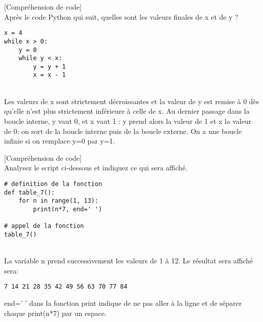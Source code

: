 \documentclass[a4paper,12pt]{article}
\begin{document}
\finexo
\exo{}[Compréhension de code]  ~\\ 
Après le code Python qui suit, quelles sont les valeurs finales de x et de y ?
\begin{lstlisting}
x = 4
while x > 0:
    y = 0
    while y < x:
        y = y + 1
        x = x - 1
\end{lstlisting}
\begin{correction}
		~\\ \vspace{0pt}
Les valeurs de x sont strictement décroissantes et la valeur de y est remise à 0 dès qu'elle n'est plus strictement inférieure à celle de x. Au dernier passage dans la boucle interne, y vaut 0, et x vaut 1 : y prend alors la valeur de 1 et x la valeur de 0;
on sort de la boucle interne puis de la boucle externe.
On a une boucle infinie si on remplace y=0 par y=1.
\end{correction}

\finexo
\exo{}[Compréhension de code]  ~\\ 
Analysez le script ci-dessous et indiquez ce qui sera affiché.
\begin{lstlisting}
# definition de la fonction
def table_7():
    for n in range(1, 13):
        print(n*7, end=' ')
    
# appel de la fonction
table_7()
\end{lstlisting}
\begin{correction}
		~\\ \vspace{-5pt}
La variable n prend successivement les valeurs de 1 à 12.
Le résultat sera affiché sera:
\begin{lstlisting}
7 14 21 28 35 42 49 56 63 70 77 84 
\end{lstlisting}
end=' '  dans la fonction print indique de ne pas aller à la ligne et de séparer chaque print(n*7) par un espace.
	\end{correction}
\end{document}
